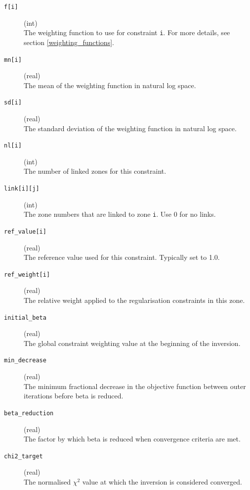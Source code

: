 \documentclass[a4paper,12pt]{article}
\begin{document}
\begin{description}
    \item[\texttt{f[i]}] (int)\hfill \\
          The weighting function to use for constraint \texttt{i}. For more details, see section \ref{weighting_functions}.

    \item[\texttt{mn[i]}] (real)\hfill \\
          The mean of the weighting function in natural log space.

    \item[\texttt{sd[i]}] (real)\hfill \\
          The standard deviation of the weighting function in natural log space.

    \item[\texttt{nl[i]}] (int)\hfill \\
          The number of linked zones for this constraint.

    \item[\texttt{link[i][j]}] (int)\hfill \\
          The zone numbers that are linked to zone \texttt{i}. Use 0 for no links.

    \item[\texttt{ref\_value[i]}] (real)\hfill \\
          The reference value used for this constraint. Typically set to 1.0.

    \item[\texttt{ref\_weight[i]}] (real)\hfill \\
          The relative weight applied to the regularisation constraints in this zone.

    \item[\texttt{initial\_beta}] (real)\hfill \\
          The global constraint weighting value at the beginning of the inversion.

    \item[\texttt{min\_decrease}] (real)\hfill \\
          The minimum fractional decrease in the objective function between outer iterations before beta is reduced.

    \item[\texttt{beta\_reduction}] (real)\hfill \\
          The factor by which beta is reduced when convergence criteria are met.

    \item[\texttt{chi2\_target}] (real)\hfill \\
          The normalised $\chi^2$ value at which the inversion is considered converged.


\end{description}
\end{document}
